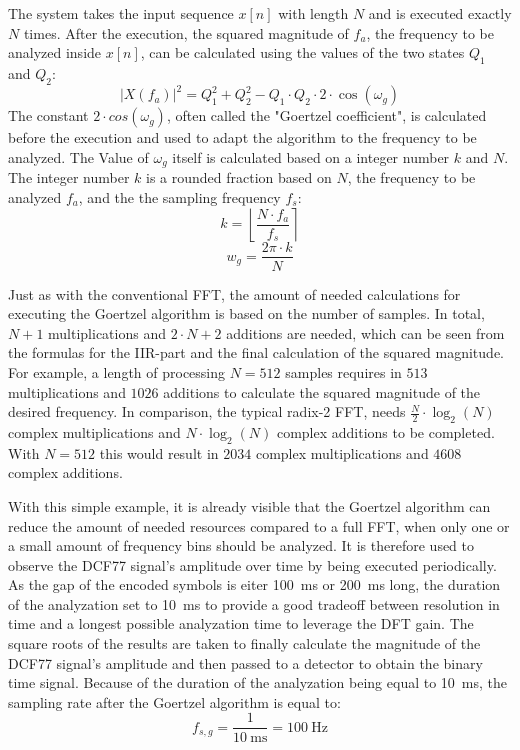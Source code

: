 \documentclass[conference]{IEEEtran}
\begin{document}
\FloatBarrier\noindent
The system takes the input sequence $x[n]$ with length $N$ and is executed exactly $N$ times.
After the execution, the squared magnitude of $f_{a}$, the frequency to be analyzed inside $x[n]$, can be calculated using the values of the two states $Q_{1}$ and $Q_{2}$:
\begin{equation}
    |X(f_{a})|^2 = Q_{1}^2 + Q_{2}^2 - Q_{1} \cdot Q_{2} \cdot 2 \cdot \cos(\omega_{g})
    \label{eqn:goertzel-mag}
\end{equation}
The constant $2 \cdot cos(\omega_{g})$, often called the "Goertzel coefficient", is calculated before the execution and used to adapt the algorithm to the frequency to be analyzed.
The Value of $\omega_{g}$ itself is calculated based on a integer number $k$ and $N$.
The integer number $k$ is a rounded fraction based on $N$, the frequency to be analyzed $f_{a}$, and the the sampling frequency $f_{s}$:
\begin{equation}
    k = \left\lfloor \frac{N \cdot f_{a}}{f_{s}} \right\rceil
    \label{eqn:goertzel-k}
\end{equation}
\begin{equation}
    w_g = \frac{2\pi \cdot k}{N}
    \label{eqn:goertzel-omega}
\end{equation}

\par
Just as with the conventional FFT, the amount of needed calculations for executing the Goertzel algorithm is based on the number of samples.
In total, $N + 1$ multiplications and $2 \cdot N + 2$ additions are needed, which can be seen from the formulas for the IIR-part and the final calculation of the squared magnitude.
For example, a length of processing $N = 512$ samples requires in $513$ multiplications and $1026$ additions to calculate the squared magnitude of the desired frequency.
In comparison, the typical radix-2 FFT, needs $\frac{N}{2} \cdot \log_{2}(N)$ complex multiplications and $N \cdot \log_{2}(N)$ complex additions to be completed. With $N = 512$ this would result in $2034$ complex multiplications and $4608$ complex additions.
\par
With this simple example, it is already visible that the Goertzel algorithm can reduce the amount of needed resources compared to a full FFT, when only one or a small amount of frequency bins should be analyzed.
It is therefore used to observe the DCF77 signal's amplitude over time by being executed periodically.
As the gap of the encoded symbols is eiter \SI{100}{\milli\second} or \SI{200}{\milli\second} long, the duration of the analyzation set to \SI{10}{\milli\second} to provide a good tradeoff between resolution in time and a longest possible analyzation time
to leverage the DFT gain.
The square roots of the results are taken to finally calculate the magnitude of the DCF77 signal's amplitude and then passed to a detector to obtain the binary time signal.
Because of the duration of the analyzation being equal to \SI{10}{\milli\second}, the sampling rate after the Goertzel algorithm is equal to:
\begin{equation}
    f_{s,g} = \frac{1}{\SI{10}{\milli\second}} = \SI{100}{\hertz}
\end{equation}
\end{document}
